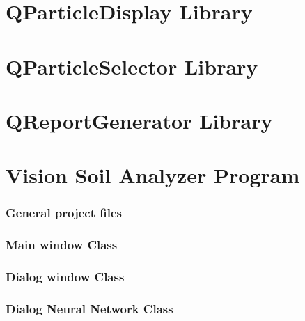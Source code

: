 \documentclass[11pt,fleqn,,a4paper,twoside,openright]{book}
\begin{document}
\chapter{QParticleDisplay Library}



\newpage

\chapter{QParticleSelector Library}



\newpage

\chapter{QReportGenerator Library}



\newpage

\chapter{Vision Soil Analyzer Program}
\subsection*{General project files}


\newpage
\subsection*{Main window Class}


\newpage
\subsection*{Dialog window Class}


\newpage
\subsection*{Dialog Neural Network Class}


\newpage
\end{document}
